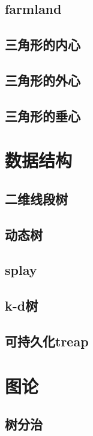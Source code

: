 \documentclass[landscape,a4paper]{article}
\begin{document}
\begin{spacing}{0.3}
\begin{multicols}{3}
	\subsection{farmland}
		
	\subsection{三角形的内心}
		
	\subsection{三角形的外心}
		
	\subsection{三角形的垂心}
		
	
	
	\section{数据结构}
	\subsection{二维线段树}
	
	\subsection{动态树}
	
	\subsection{splay}
	
	\subsection{k-d树}
	
	\subsection{可持久化treap}
	
	
	\section{图论}
	\subsection{树分治}
	

\end{multicols}
\end{spacing}
\end{document}
